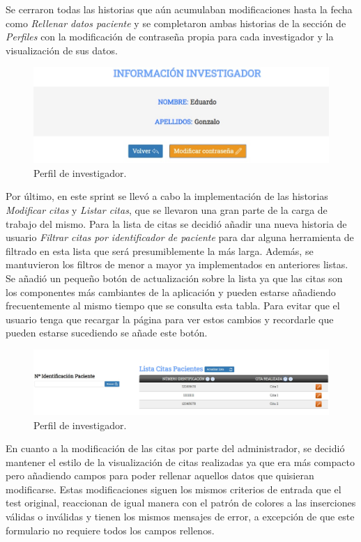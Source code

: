 Se cerraron todas las historias que aún acumulaban modificaciones hasta la fecha como \textit{Rellenar datos paciente} y se completaron ambas historias de la sección de \textit{Perfiles} con la modificación de contraseña propia para cada investigador y la visualización de sus datos.

\begin{figure}[h]
    \centering
     \includegraphics[width=14.cm,height=4.cm]{images/perfil.jpg}
    \caption{Perfil de investigador.}
\end{figure}
\newpage

Por último, en este sprint se llevó a cabo la implementación de las historias \textit{Modificar citas} y \textit{Listar citas}, que se llevaron una gran parte de la carga de trabajo del mismo. Para la lista de citas se decidió añadir una nueva historia de usuario \textit{Filtrar citas por identificador de paciente} para dar alguna herramienta de filtrado en esta lista que será presumiblemente la más larga. Además, se mantuvieron los filtros de menor a mayor ya implementados en anteriores listas. Se añadió un pequeño botón de actualización sobre la lista ya que las citas son los componentes más cambiantes de la aplicación y pueden estarse añadiendo frecuentemente al mismo tiempo que se consulta esta tabla. Para evitar que el usuario tenga que recargar la página para ver estos cambios y recordarle que pueden estarse sucediendo se añade este botón.

\begin{figure}[h]
    \centering
     \includegraphics[width=1\textwidth]{images/listarCitas.jpg}
    \caption{Perfil de investigador.}
\end{figure}

En cuanto a la modificación de las citas por parte del administrador, se decidió mantener el estilo de la visualización de citas realizadas ya que era más compacto pero añadiendo campos para poder rellenar aquellos datos que quisieran modificarse. Estas modificaciones siguen los mismos criterios de entrada que el test original, reaccionan de igual manera con el patrón de colores a las inserciones válidas o inválidas y tienen los mismos mensajes de error, a excepción de que este formulario no requiere todos los campos rellenos.

